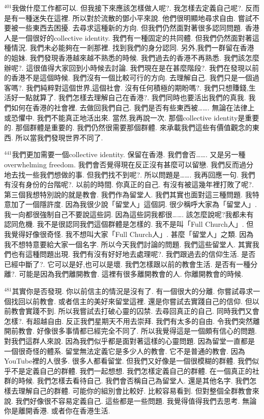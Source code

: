 \documentclass{book}
\begin{document}
$^{401}$我做什麼工作都可以.
但我接下來應該怎樣做人呢?.
我怎樣去定義自己呢?.
反而是有一種迷失在這裡.
所以對於流散的鄧小平來說.
他們很明顯地尋求自由.
嘗試不要被一些東西去困擾.
去尋求這種新的方向.
但我們仍然面對著很多認同問題.
香港人是一個很好的collective identity.
我們有一種固定的共同體.
但我們仍然面對著這種情況.
我們未必能夠在一剎那裡.
找到我們的身分認同.
另外,我們一群留在香港的姐妹.
我們發現香港越來越不熟悉的時候.
我們過去的香港不再熟悉.
我們該怎麼辦呢?.
這很值得大家回到小時候去討論.
我們現在是在甚麼階段?.
我們在發現以前的香港不是這個時候.
我們沒有一個比較可行的方向.
去理解自己.
我們只是一個過客嗎?.
我們純粹對這個世界,這個社會.
沒有任何積極的期盼嗎?.
我們只想賺錢,生活好一點就算了.
我們怎樣去理解自己在香港?.
我們同時也要活出我們的真我.
我們如何在香港的社會裡.
去做回我們自己.
我們是否有些東西被…….
無論在法律上或恐懼中.
我們不能真正地活出來.
當然,我再說一次.
那個collective identity是重要的.
那個群體是重要的.
我們仍然很需要那個群體.
來承載我們這些有價值觀念的東西.
所以當我們發現世界不同了.

$^{441}$我們更加需要一個collective identity.
保留在香港.
我們會否…….
又是另一種overwhelming freedom.
我們會否覺得現在反正沒有甚麼可以留戀.
我們反而過分地去找一些我們想做的事.
但我們找不到呢?.
所以問題是…….
我再回應一句.
我們有沒有身份的台階呢?.
以前的時間.
你真正的自己.
有沒有被這幾年裡打敗了呢?.
第三個我想特別說的就是教會.
我們作為留堂人.
我們其實也面對這三種問題.
我特意加了一個隱許度.
因為我很少說「留堂人」這個詞.
很少稱呼大家為「留堂人」.
我一向都很強制自己不要說這些詞.
因為這些詞我都很…….
該怎麼說呢?我都未有認同危機.
我不是很認同我們這個群體是怎樣的.
我不是叫「Full Church人」.
但我覺得好像很奇怪.
我不想叫大家「Full Church人」.
甚麼「留堂人」之類.
因為我不想特意要給大家一個名字.
所以今天我們討論的問題.
我們這些留堂人.
其實我們也有這種問題出現.
我們有沒有好好地去處理呢?.
我們跟過去的信仰生活.
是否已經中斷了?.
它可以是好,也可以是壞.
我們怎樣跟以前的教會生活.
是否有一種分離?.
可能是因為我們離開教會.
這裡有很多離開教會的人.
你離開教會的時候.

$^{481}$其實你是否發現.
你以前信主的情況是沒有了.
有一個很大的分離.
你嘗試尋求一個找回以前教會.
或者信主的美好來留堂這裡.
還是你嘗試去實踐自己的信仰.
但以前教會實踐不到.
所以我嘗試去打破心靈的囚禁.
去尋回真正的自己.
同時我們又會怎樣?.
有超越自由.
反正我們星期天不用去崇拜.
我們有太多的自由.
令我們突然離開前教會.
好像很多事情都已經完全不同了.
所以我覺得這是一個頗有信心的問題.
對我們這群人來說.
因為我們似乎都是面對著這樣的心靈問題.
因為留堂一直都是一個很奇怪的體系.
留堂無法定義它是多少人的教會.
它不是普通的教會.
因為YouTube裡的人很多.
很多人都看留堂.
但我們又好像是一個很模糊的群體.
我們似乎不是定義自己的群體.
我們一起想想.
我們怎樣定義自己的群體.
在一個真正的社群的時候.
我們怎樣去看待自己.
我們會否稱自己為留堂人.
還是其他名字.
我們怎樣去理解自己的群體.
可能你的組別會比較好.
比較容易看到.
但對整個全群教會來說.
我們好像很不容易定義自己.
這些都是一些問題.
我覺得值得我們去思考.
無論你是離開香港.
或者你在香港生活.
\end{document}
